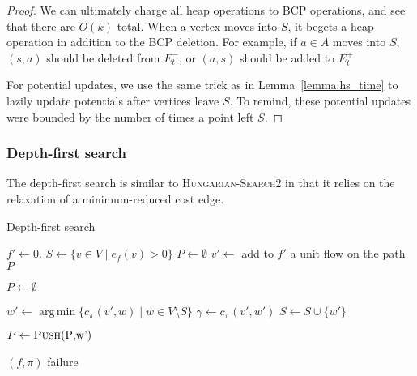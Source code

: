 \documentclass[11pt]{article}
\DeclareMathOperator*{\argmin}{arg\,min}
\theoremstyle{plain}
\begin{document}
\begin{proof}
We can ultimately charge all heap operations to BCP operations, and
see that there are $O(k)$ total.
When a vertex moves into $S$, it begets a heap operation in addition
to the BCP deletion.
For example, if $a \in A$ moves into $S$, $(s, a)$ should be deleted
from $E_t^-$, or $(a, s)$ should be added to $E_t^+$


For potential updates, we use the same trick as in
Lemma~\ref{lemma:hs_time} to lazily update potentials after vertices
leave $S$.
To remind, these potential updates were bounded by the number of times
a point left $S$.

\end{proof}


\subsubsection{Depth-first search}

The depth-first search is similar to \textsc{Hungarian-Search2} in that it
relies on the relaxation of a minimum-reduced cost edge.
\begin{algorithm}
\caption{Depth-first search}
\begin{algorithmic}[1]
	\State $f' \gets 0$.
	\State $S \gets \{v \in V \mid e_f(v) > 0\}$
	\State $P \gets \emptyset$
	\Repeat
		\State $v' \gets$ 
			\State add to $f'$ a unit flow on the path $P$

			\State $P \gets \emptyset$
		\EndIf

		\Statex %
		\State $w' \gets \argmin\{c_\pi(v', w) \mid w \in V \setminus S\}$
		\State $\gamma \gets c_\pi(v', w')$
		\Statex %
			\State $S \gets S \cup \{w'\}$

			\State $P \gets \Call{Push}{$P$, $w'$}$

		\EndIf




		 
			\State\Return $(f, \pi)$
		\EndIf
	\State\Return failure
\EndFunction
\end{algorithmic}
\end{algorithm}

\end{document}
